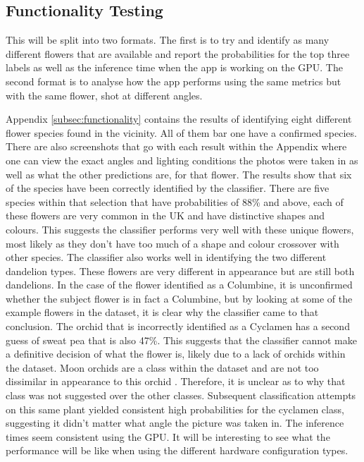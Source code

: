 \documentclass[12pt,a4paper]{report}
\begin{document}
\subsection{Functionality Testing}

This will be split into two formats. The first is to try and identify as many different flowers that are available 
and report the probabilities for the top three labels as well as the inference time when the app is working on the GPU. 
The second format is to analyse how the app performs using the same metrics but with the same flower, shot at different 
angles.

Appendix \ref{subsec:functionality} contains the results of identifying eight different flower species found in the 
vicinity. All of them bar 
one have a confirmed species. There are also screenshots that go with each result within the Appendix where one can view 
the exact angles and lighting conditions the photos were taken in as well as what the other predictions are, for that 
flower. The results show that six of the species have been correctly identified by the classifier. There are five 
species within that selection that have probabilities of 88\% and above, each of these flowers are very common in 
the UK and have distinctive shapes and colours. This suggests the classifier performs very well with these unique 
flowers, most likely as they don't have too much of a shape and colour crossover with other species. The classifier also
works well in identifying the two different dandelion types. These flowers are very different in appearance but are 
still both dandelions. In the case of the flower identified as a Columbine, it is unconfirmed whether the subject 
flower is in fact a Columbine, but by looking at some of the example flowers in the dataset, it is clear why the 
classifier came to that conclusion. The orchid that is incorrectly identified as a Cyclamen has a second guess of 
sweat pea that is also 47\%. This suggests that the classifier cannot make a definitive decision of what the flower is,
likely due to a lack of orchids within the dataset. Moon orchids are a class within the dataset and are not too 
dissimilar in appearance to this orchid \citep{PlantsState}. Therefore, it is unclear as to why that class was not 
suggested over the other classes. Subsequent classification attempts on this same plant yielded consistent high 
probabilities for the cyclamen class, suggesting it didn't matter what angle the picture was taken in. The inference 
times seem consistent using the GPU. It will be interesting to see what the performance will be like when using the
different hardware configuration types.
\end{document}
